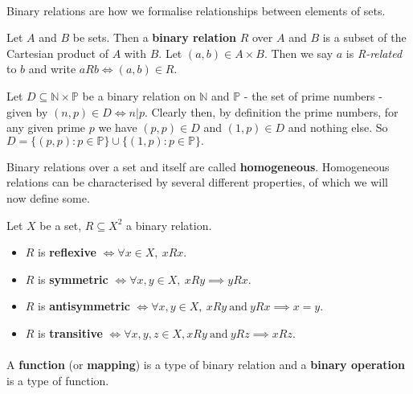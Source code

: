 \documentclass[../abstract_algebra.tex]{subfiles}
\begin{document}
        \paragraph{}
        Binary relations are how we formalise relationships between elements of sets.
        \begin{definition}
            Let $A$ and $B$ be sets. Then a \textbf{binary relation} $R$ over $A$ and $B$ is a subset of the Cartesian product of $A$ with $B$. Let $(a, b) \in A \times B$. Then we say $a$ is \textit{R-related} to $b$ and write $aRb \iff (a, b) \in R$. 
        \end{definition}
        \begin{example}
            Let $D \subseteq \mathbb{N} \times \mathbb{P}$ be a binary relation on $\mathbb{N}$ and $\mathbb{P}$ - the set of prime numbers - given by $(n, p) \in D \iff n|p$. Clearly then, by definition the prime numbers, for any given prime $p$ we have $(p, p) \in D$ and $(1, p) \in D$ and nothing else. So $D = \{(p, p): p \in \mathbb{P}\} \cup \{(1, p): p \in \mathbb{P}\}.$
        \end{example}
        Binary relations over a set and itself are called \textbf{homogeneous}. 
        Homogeneous relations can be characterised by several different properties, of which we will now define some.
        \begin{definition} 
            Let $X$ be a set, $R \subseteq X^2$ a binary relation.
            \begin{itemize}
                \item $R$ is \textbf{reflexive} $\iff \forall x \in X,\  xRx$.
                \item $R$ is \textbf{symmetric} $\iff \forall x, y \in X,\ xRy \implies yRx$.
                \item $R$ is \textbf{antisymmetric} $\iff \forall x, y \in X,\ xRy\ \text{and}\ yRx \implies x=y$.
                \item $R$ is \textbf{transitive} $\iff \forall x, y, z \in X, xRy\ \text{and}\ yRz \implies xRz$.
            \end{itemize}
        \end{definition}
        
        \paragraph{}
        A \textbf{function} (or \textbf{mapping}) is a type of binary relation and a \textbf{binary operation} is a type of function.
\end{document}

